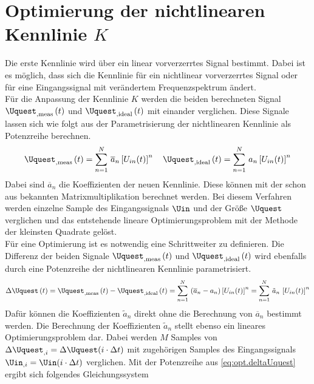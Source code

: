 \documentclass[../Report.tex]{subfiles}
\begin{document}
\section{Optimierung der nichtlinearen Kennlinie $K$}
\label{sec:opt.K}
Die erste Kennlinie wird über ein linear vorverzerrtes Signal bestimmt. Dabei ist es möglich, dass sich die Kennlinie für ein nichtlinear vorverzerrtes Signal oder für eine Eingangssignal mit verändertem Frequenzspektrum ändert. \\
Für die Anpassung der Kennlinie $K$ werden die beiden berechneten Signal $\Uquest_{, \mathrm{meas}} \oft$ und $\Uquest_{, \mathrm{ideal}} \oft$ mit einander verglichen. Diese Signale lassen sich wie folgt aus der Parametrisierung der nichtlinearen Kennlinie als Potenzreihe berechnen.
\begin{align}
	\Uquest_{, \mathrm{meas}} \oft = \sum_{n=1}^N \, \overline{a}_n \left[ U_{in}(t) \right]^n
	\quad
	\Uquest_{, \mathrm{ideal}} \oft = \sum_{n=1}^N \, a_n \left[ U_{in}(t) \right]^n
\end{align}
Dabei sind $\overline{a}_n$ die Koeffizienten der neuen Kennlinie. Diese können mit der schon aus \cite{harzheim} bekannten Matrixmultiplikation berechnet werden. Bei diesem Verfahren werden einzelne Sample des Eingangssignals $\Uin$ und der Größe $\Uquest$ verglichen und das entstehende lineare Optimierungsproblem mit der Methode der kleinsten Quadrate gelöst. \\
Für eine Optimierung ist es notwendig eine Schrittweiter zu definieren. Die Differenz der beiden Signale $\Uquest_{, \mathrm{meas}} \oft$ und $\Uquest_{, \mathrm{ideal}} \oft$ wird ebenfalls durch eine Potenzreihe der nichtlinearen Kennlinie parametrisiert.
\begin{align}
\label{eq:opt.deltaUquest}
	\Delta \Uquest \oft = \Uquest_{, \mathrm{meas}} \oft - \Uquest_{, \mathrm{ideal}} \oft
	=
	\sum_{n=1}^N \, \left( \overline{a}_n -  a_n\right) \left[ U_{in}(t) \right]^n
	=
	\sum_{n=1}^N \, \tilde{a}_n \, \left[ U_{in}(t) \right]^n	
\end{align}
Dafür können die Koeffizienten $\tilde{a}_n$ direkt ohne die Berechnung von $\overline{a}_n$ bestimmt werden. Die Berechnung der Koeffizienten $\tilde{a}_n$ stellt ebenso ein lineares Optimierungsproblem dar. Dabei werden $M$ Samples von ${\Delta \Uquest_{,i} = \Delta \Uquest (i \cdot \Delta t)}$ mit zugehörigen Samples des Eingangssignals ${\Uin_{,i} = \Uin (i \cdot \Delta t)}$ verglichen. Mit der Potenzreihe aus  \eqref{eq:opt.deltaUquest} ergibt sich folgendes Gleichungssystem
\end{document}
